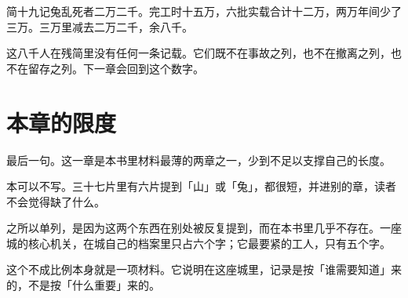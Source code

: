 简十九记兔乱死者二万二千。完工时十五万，六批实载合计十二万，两万年间少了三万。三万里减去二万二千，余八千。

这八千人在残简里没有任何一条记载。它们既不在事故之列，也不在撤离之列，也不在留存之列。下一章会回到这个数字。

\section{本章的限度}

最后一句。这一章是本书里材料最薄的两章之一，少到不足以支撑自己的长度。

本可以不写。三十七片里有六片提到「山」或「兔」，都很短，并进别的章，读者不会觉得缺了什么。

之所以单列，是因为这两个东西在别处被反复提到，而在本书里几乎不存在。一座城的核心机关，在城自己的档案里只占六个字；它最要紧的工人，只有五个字。

这个不成比例本身就是一项材料。它说明在这座城里，记录是按「谁需要知道」来的，不是按「什么重要」来的。

